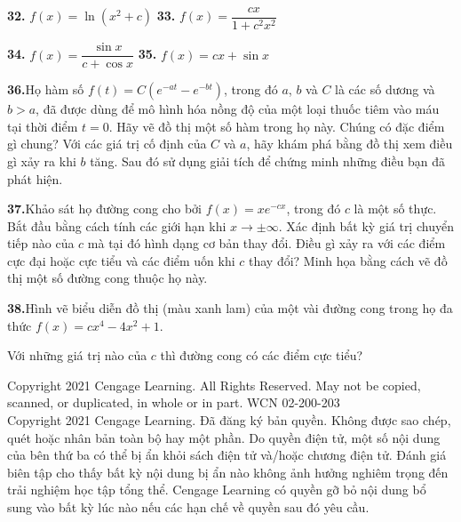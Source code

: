 \documentclass[10pt,a4paper]{article}
\newcommand{\exercisedivider}{\par\vspace{4pt}{\color{stewartblue!60}\hrule height 0.45pt}\vspace{4pt}}
\begin{document}
\begin{minipage}[t]{0.485\textwidth}
  \noindent\textbf{32.}\;\; $f(x) = \ln(x^2 + c)$ \hfill \textbf{33.}\;\; $f(x) = \dfrac{cx}{1 + c^2 x^2}$
  \vspace{2.5pt}

  \noindent\textbf{34.}\;\; $f(x) = \dfrac{\sin x}{c + \cos x}$ \hfill \textbf{35.}\;\; $f(x) = cx + \sin x$

  \exercisedivider

  \noindent\textbf{36.}\quad Họ hàm số $f(t) = C(e^{-at} - e^{-bt})$, trong đó $a$, $b$ và $C$ là các số dương và $b > a$, đã được dùng để mô hình hóa nồng độ của một loại thuốc tiêm vào máu tại thời điểm $t = 0$. Hãy vẽ đồ thị một số hàm trong họ này. Chúng có đặc điểm gì chung? Với các giá trị cố định của $C$ và $a$, hãy khám phá bằng đồ thị xem điều gì xảy ra khi $b$ tăng. Sau đó sử dụng giải tích để chứng minh những điều bạn đã phát hiện.
  \vspace{4pt}

  \noindent\textbf{37.}\quad Khảo sát họ đường cong cho bởi $f(x) = x e^{-cx}$, trong đó $c$ là một số thực. Bắt đầu bằng cách tính các giới hạn khi $x \to \pm\infty$. Xác định bất kỳ giá trị chuyển tiếp nào của $c$ mà tại đó hình dạng cơ bản thay đổi. Điều gì xảy ra với các điểm cực đại hoặc cực tiểu và các điểm uốn khi $c$ thay đổi? Minh họa bằng cách vẽ đồ thị một số đường cong thuộc họ này.
  \vspace{4pt}

  \noindent\textbf{38.}\quad Hình vẽ biểu diễn đồ thị (màu xanh lam) của một vài đường cong trong họ đa thức $f(x) = cx^4 - 4x^2 + 1$.
  \begin{exsubparts}
    \item Với những giá trị nào của $c$ thì đường cong có các điểm cực tiểu?
  \end{exsubparts}
\end{minipage}

\vfill
\begin{center}
\fontsize{5.2pt}{6.4pt}\selectfont\color{gray}
Copyright 2021 Cengage Learning. All Rights Reserved. May not be copied, scanned, or duplicated, in whole or in part. WCN 02-200-203\\[1pt]
Copyright 2021 Cengage Learning. Đã đăng ký bản quyền. Không được sao chép, quét hoặc nhân bản toàn bộ hay một phần. Do quyền điện tử, một số nội dung của bên thứ ba có thể bị ẩn khỏi sách điện tử và/hoặc chương điện tử. Đánh giá biên tập cho thấy bất kỳ nội dung bị ẩn nào không ảnh hưởng nghiêm trọng đến trải nghiệm học tập tổng thể. Cengage Learning có quyền gỡ bỏ nội dung bổ sung vào bất kỳ lúc nào nếu các hạn chế về quyền sau đó yêu cầu.
\end{center}
\end{document}
